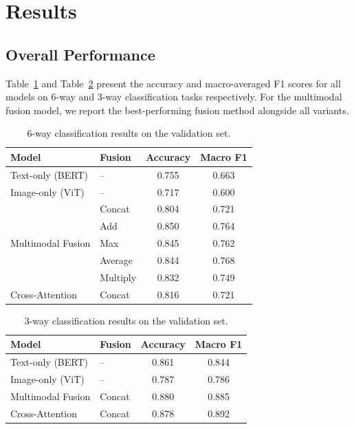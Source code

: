 \section{Results}

\subsection{Overall Performance}

Table~\ref{tab:results_6way} and Table~\ref{tab:results_3way} present the accuracy and macro-averaged F1 scores for all models on 6-way and 3-way classification tasks respectively. For the multimodal fusion model, we report the best-performing fusion method alongside all variants.

\begin{table}[h]
\centering
\caption{6-way classification results on the validation set.}
\label{tab:results_6way}
\begin{tabular}{llcc}
\hline
\textbf{Model} & \textbf{Fusion} & \textbf{Accuracy} & \textbf{Macro F1} \\
\hline
Text-only (BERT)        & --        & 0.755 & 0.663 \\
Image-only (ViT)        & --        & 0.717 & 0.600 \\
\hline
\multirow{5}{*}{Multimodal Fusion} 
                        & Concat    & 0.804 & 0.721 \\
                        & Add       & 0.850 & 0.764 \\
                        & Max       & 0.845 & 0.762 \\
                        & Average   & 0.844 & 0.768 \\
                        & Multiply  & 0.832 & 0.749 \\
\hline
Cross-Attention         & Concat    & 0.816 & 0.721 \\
\hline
\end{tabular}
\end{table}

\begin{table}[h]
\centering
\caption{3-way classification results on the validation set.}
\label{tab:results_3way}
\begin{tabular}{llcc}
\hline
\textbf{Model} & \textbf{Fusion} & \textbf{Accuracy} & \textbf{Macro F1} \\
\hline
Text-only (BERT)        & --        & 0.861 & 0.844 \\
Image-only (ViT)        & --        & 0.787 & 0.786 \\
Multimodal Fusion       & Concat    & 0.880 & 0.885 \\
Cross-Attention         & Concat    & 0.878 & 0.892 \\
\hline
\end{tabular}
\end{table}

